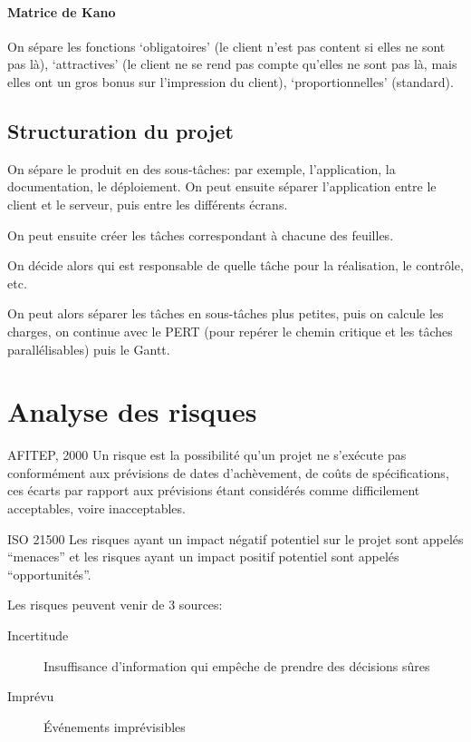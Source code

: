 \documentclass[10pt,a4paper,french]{article}
\begin{document}
\paragraph{Matrice de Kano}
On sépare les fonctions `obligatoires' (le client n'est pas content si elles ne sont pas là), `attractives' (le client ne se rend pas compte qu'elles ne sont pas là, mais elles ont un gros bonus sur l'impression du client), `proportionnelles' (standard).

\subsection{Structuration du projet}

On sépare le produit en des sous-tâches: par exemple, l'application, la documentation, le déploiement. On peut ensuite séparer l'application entre le client et le serveur, puis entre les différents écrans.

On peut ensuite créer les tâches correspondant à chacune des feuilles.

On décide alors qui est responsable de quelle tâche pour la réalisation, le contrôle, etc.

On peut alors séparer les tâches en sous-tâches plus petites, puis on calcule les charges, on continue avec le PERT (pour repérer le chemin critique et les tâches parallélisables) puis le Gantt.

\section{Analyse des risques}

\begin{cquote}{AFITEP, 2000}
Un risque est la possibilité qu'un projet ne s'exécute pas conformément aux prévisions de dates d'achèvement, de coûts de spécifications, ces écarts par rapport aux prévisions étant considérés comme difficilement acceptables, voire inacceptables.
\end{cquote}

\begin{cquote}{ISO 21500}
Les risques ayant un impact négatif potentiel sur le projet sont appelés ``menaces'' et les risques ayant un impact positif potentiel sont appelés ``opportunités''.
\end{cquote}

Les risques peuvent venir de 3 sources:
\begin{description}
\item[Incertitude] Insuffisance d'information qui empêche de prendre des décisions sûres
\item[Imprévu] Événements imprévisibles
\end{description}
\end{document}
